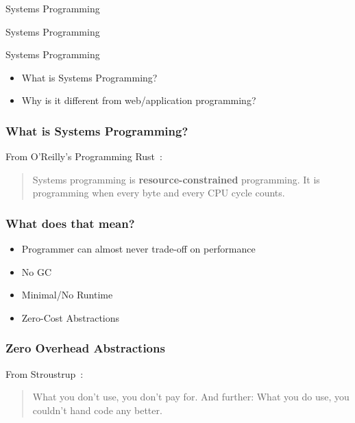 \begin{section}{Systems Programming}

  \begin{frame}
    \centerline{
      \huge{Systems Programming}
    }
  \end{frame}

  \begin{frame}{Systems Programming}
    \begin{itemize}
    \item What is Systems Programming?
    \item Why is it different from web/application programming?
    \end{itemize}
  \end{frame}

  \begin{frame}
    \frametitle{What is Systems Programming?}
    \begin{block}{From O'Reilly's Programming Rust~\cite{ProgRustPreface1}:}
      \begin{quotation}
        Systems programming is \textbf{resource-constrained}
        programming. It is programming when every byte and every CPU cycle
        counts.
      \end{quotation}
    \end{block}
  \end{frame}

  \begin{frame}
    \frametitle{What does that mean?}
    \begin{itemize}
    \item Programmer can almost never trade-off on performance
    \item No GC
    \item Minimal/No Runtime
    \item Zero-Cost Abstractions~\cite{Stroustrup}
    \end{itemize}
  \end{frame}

  \begin{frame}
    \frametitle{Zero Overhead Abstractions}
    \begin{block}{From Stroustrup~\cite{Stroustrup}:}
      \begin{quotation}
        What you don't use, you don't pay for. And further: What you do
        use, you couldn't hand code any better.
      \end{quotation}
    \end{block}
  \end{frame}

\end{section}
